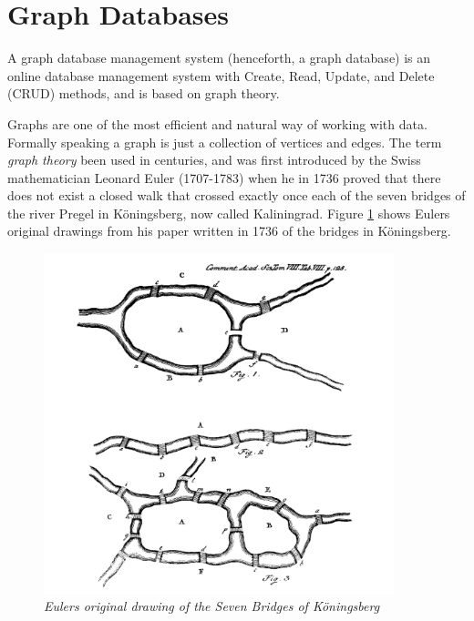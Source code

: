 \section{Graph Databases}
A graph database management system \citep{robinson13} (henceforth, a graph database) is an online database management system with Create, Read, Update, and Delete (CRUD) methods, and is based on graph theory.

Graphs are one of the most efficient and natural way of working with data. Formally speaking a graph is just a collection of vertices and edges. The term \textit{graph theory} been used in centuries, and was first introduced by the Swiss mathematician Leonard Euler (1707-1783) when he in 1736 proved that there does not exist a closed walk that crossed exactly once each of the seven bridges of the river Pregel in Köningsberg, now called Kaliningrad\citep{alexanderson06}. Figure \ref{fig:7bridgesEuler} shows Eulers original drawings from his paper written in 1736 \citep{euler1741} of the bridges in Köningsberg. 

\begin{figure}[H]
  \centering
  \includegraphics[width=4in]{assets/7bridges-euler.png}
  \caption{\textit{Eulers original drawing of the Seven Bridges of Köningsberg}} 
  \label{fig:7bridgesEuler}
\end{figure}

